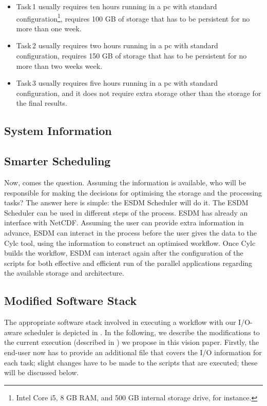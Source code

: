 \documentclass[a4paper]{article}
\begin{document}
\begin{itemize}

\item Task\,1 usually requires ten hours running in a pc with standard configuration\footnote{Intel Core i5, 8 GB RAM, and 500 GB internal storage drive, for instance.}, requires 100 GB of storage that has to be persistent for no more than one week.

\item Task\,2 usually requires two hours running in a pc with standard configuration, requires 150 GB of storage that has to be persistent for no more than two weeks week.

\item Task\,3 usually requires five hours running in a pc with standard configuration, and it does not require extra storage other than the storage for the final results.

\end{itemize}


\subsection{System Information}

\subsection{Smarter Scheduling}

Now, comes the question. Assuming the information is available, who will be responsible for making the decisions for optimising the storage and the processing tasks? The answer here is simple: the ESDM Scheduler will do it. The ESDM Scheduler can be used in different steps of the process. ESDM has already an interface with NetCDF. Assuming the user can provide extra information in advance, ESDM can interact in the process before the user gives the data to the Cylc tool, using the information to construct an optimised workflow. Once Cylc builds the workflow, ESDM can interact again after the configuration of the scripts for both effective and efficient run of the parallel applications regarding the available storage and architecture.


\subsection{Modified Software Stack}

The appropriate software stack involved in executing a workflow with our I/O-aware scheduler is depicted in .
In the following, we describe the modifications to the current execution (described in ) we propose in this vision paper.
Firstly, the end-user now has to provide an additional file that covers the I/O information for each task; slight changes have to be made to the scripts that are executed; these will be discussed below.
\end{document}
